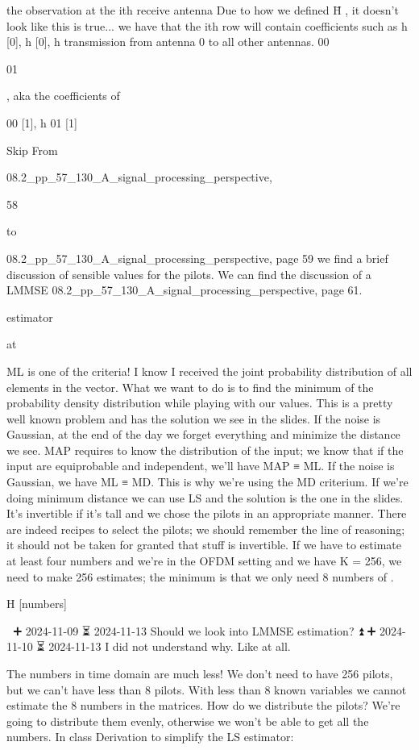 {{{the observation at the ith receive antenna Due to how we defined H̄ , it doesn't look like this is true... we have that the ith row will contain coefficients such as h [0], h [0], h transmission from antenna 0 to all other antennas.
00

01

, aka the coefficients of

00 [1], h 01 [1]

Skip From

08.2_pp_57_130_A_signal_processing_perspective,

58

to

08.2_pp_57_130_A_signal_processing_perspective, page 59 we find a brief discussion of sensible values for the pilots.
We can find the discussion of a LMMSE 08.2_pp_57_130_A_signal_processing_perspective, page 61.

estimator

at

ML is one of the criteria!
I know I received the joint probability distribution of all elements in the vector.
What we want to do is to find the minimum of the probability density distribution while playing with our values.
This is a pretty well known problem and has the solution we see in the slides.
If the noise is Gaussian, at the end of the day we forget everything and minimize the distance we see.
MAP requires to know the distribution of the input; we know that if the input are equiprobable and independent, we'll have MAP ≡ ML. If the noise is Gaussian, we have ML ≡ MD. This is why we're using the MD criterium. If we're doing minimum distance we can use LS and the solution is the one in the slides.
It's invertible if it's tall and we chose the pilots in an appropriate manner.
There are indeed recipes to select the pilots; we should remember the line of reasoning;
it should not be taken for granted that stuff is invertible.
If we have to estimate at least four numbers and we're in the OFDM setting and we have K = 256, we need to make 256 estimates; the minimum is that we only need 8 numbers of
.

H [numbers]

🔼 ➕ 2024-11-09 ⏳ 2024-11-13 Should we look into LMMSE estimation? ⏫ ➕ 2024-11-10 ⏳ 2024-11-13 I did not understand why. Like at all.

The numbers in time domain are much less! We don't need to have 256 pilots, but we can't have less than 8 pilots. With less than 8 known variables we cannot estimate the 8 numbers in the matrices.
How do we distribute the pilots? We're going to distribute them evenly, otherwise we won't be able to get all the numbers.
In class Derivation to simplify the LS estimator:

}}}
